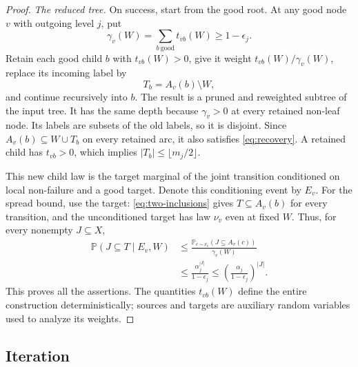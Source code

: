 \documentclass[11pt]{article}
\numberwithin{equation}{section}
\newcommand{\PP}{\mathbb P}
\begin{document}
\begin{proof}
\medskip\noindent
\textit{The reduced tree.}
On success, start from the good root. At any good node $v$ with
outgoing level $j$, put
\[
 \gamma_v(W)=\sum_{b\ \mathrm{good}}t_{vb}(W)\ge1-\epsilon_j.
\]
Retain each good child $b$ with $t_{vb}(W)>0$, give it weight
$t_{vb}(W)/\gamma_v(W)$, replace its incoming label by
\[
 T_b=A_v(b)\setminus W,
\]
and continue recursively into $b$. The result is a pruned and
reweighted subtree of the input tree. It has the same depth because
$\gamma_v>0$ at every retained non-leaf node. Its labels are subsets
of the old labels, so it is disjoint. Since
$A_v(b)\subseteq W\cup T_b$ on every retained arc, it also satisfies
\eqref{eq:recovery}. A retained child has $t_{vb}>0$, which implies
$|T_b|\le\lfloor m_j/2\rfloor$.

This new child law is the target marginal of the joint transition
conditioned on local non-failure and a good target. Denote this
conditioning event by $E_v$. For the spread bound, use the target:
\eqref{eq:two-inclusions} gives $T\subseteq A_v(b)$ for every
transition, and the unconditioned target has law $\nu_v$ even at fixed
$W$. Thus, for every nonempty $J\subseteq X$,
\begin{align*}
 \PP(J\subseteq T\mid E_v,W)
 &\le\frac{\PP_{c\sim\nu_v}(J\subseteq A_v(c))}{\gamma_v(W)}\\
 &\le\frac{\alpha_j^{|J|}}{1-\epsilon_j}
 \le\left(\frac{\alpha_j}{1-\epsilon_j}\right)^{|J|}.
\end{align*}
This proves all the assertions. The quantities $t_{vb}(W)$ define
the entire construction deterministically; sources and targets are
auxiliary random variables used to analyze its weights.
\end{proof}

\subsection{Iteration}
\end{document}

